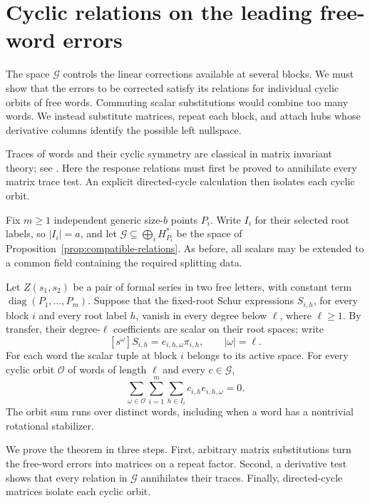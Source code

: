 \section{Cyclic relations on the leading free-word errors}
\label{sec:cyclic-obstructions}

The space \(\mathcal G\) controls the linear corrections available
at several blocks. We must show that the errors to be corrected
satisfy its relations for individual cyclic orbits of free words.
Commuting scalar substitutions would combine too many words. We
instead substitute matrices, repeat each block, and attach hubs
whose derivative columns identify the possible left nullspace.

Traces of words and their cyclic symmetry are classical in matrix
invariant theory; see \cite[\S4]{Procesi1976}. Here the response
relations must first be proved to annihilate every matrix trace test.
An explicit directed-cycle calculation then isolates each cyclic orbit.

Fix \(m\geq1\) independent generic size-\(b\) points \(P_i\).
Write \(I_i\) for their selected root labels, so \(|I_i|=a\), and
let \(\mathcal G\subseteq\bigoplus_i H_{P_i}^*\) be the space
of Proposition~\ref{prop:compatible-relations}. As before, all
scalars may be extended to a common field containing the required
splitting data.

\begin{theorem}
\label{thm:cyclic-compatibility}
Let \(Z(s_1,s_2)\) be a pair of formal series in two free letters,
with constant term \(\operatorname{diag}(P_1,\ldots,P_m)\).
Suppose that the fixed-root Schur expressions \(S_{i,h}\), for
every block \(i\) and every root label \(h\), vanish in every
degree below \(\ell\), where \(\ell\geq1\).
By transfer, their degree-\(\ell\) coefficients are scalar on
their root spaces; write
\[
 [s^\omega]S_{i,h}=e_{i,h,\omega}\pi_{i,h},
 \qquad |\omega|=\ell.
\]
For each word the scalar tuple at block \(i\) belongs to its
active space. For every cyclic orbit \(\mathcal O\) of words of
length \(\ell\) and every \(c\in\mathcal G\),
\begin{equation}
 \sum_{\omega\in\mathcal O}
 \sum_{i=1}^m\sum_{h\in I_i}
 c_{i,h}e_{i,h,\omega}=0.
 \label{eq:cyclic-error-relation}
\end{equation}
The orbit sum runs over distinct words, including when a word has
a nontrivial rotational stabilizer.
\end{theorem}

We prove the theorem in three steps. First, arbitrary matrix
substitutions turn the free-word errors into matrices on a repeat
factor. Second, a derivative test shows that every relation in
\(\mathcal G\) annihilates their traces. Finally, directed-cycle
matrices isolate each cyclic orbit.


